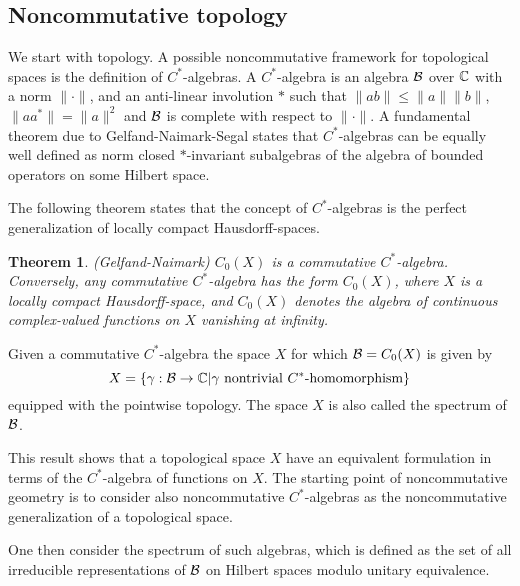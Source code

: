 \documentclass[12pt]{article}
\newcommand{\nn}{\nonumber}
\def\cb{{\cal B}}
\newtheorem{thm}{Theorem}[subsection]
\newcommand{\bbC}{{\Bbb C}}
\begin{document}



\subsection{Noncommutative topology}

We start with topology. A possible noncommutative framework for topological spaces is the definition of  $C^*$-algebras. 
%
A $C^*$-algebra is an algebra $\cb$ over $\bbC$ with a norm $\| \cdot \|$, and an anti-linear involution $*$ such that $\|ab\|\leq \| a\|\| b\|$, $\|aa^* \|=\| a\|^2$ and $\cb$ is complete with respect to $\| \cdot \|$. 
%
A fundamental theorem due to Gelfand-Naimark-Segal states that $C^*$-algebras can be equally well defined  as norm closed $*$-invariant subalgebras of the algebra of bounded operators on some Hilbert space.    
%

The following theorem states that the concept of $C^*$-algebras is the perfect generalization of  locally compact Hausdorff-spaces.   
%
\begin{thm} \label{gn}
(\textit{Gelfand-Naimark})
%
$C_0(X)$ is a commutative $C^*$-algebra. 
%
Conversely, any commutative $C^*$-algebra has the form $C_0(X) $, where $X$ is a locally compact Hausdorff-space, and $C_0(X)$ denotes the algebra of continuous complex-valued functions on $X$ vanishing at infinity.



  
\end{thm} 

Given a commutative $C^*$-algebra the space $X$ for which $\cb=C_0(X)$ is given by
\begin{equation}X= \{ \gamma :\cb \to \bbC | \gamma \hbox{ nontrivial }C^*\hbox{-homomorphism} \}\nn  \end{equation}
equipped with the pointwise topology. The space $X$ is also called the spectrum of $\cb$.
 
This result shows that a topological space $X$ have an equivalent formulation in terms of the $C^*$-algebra of functions on $X$. The starting point of noncommutative geometry is to consider also noncommutative $C^*$-algebras as the noncommutative generalization of a topological space. 


One then consider the spectrum of such algebras, which is defined as the set of all irreducible representations of $\cb$ on Hilbert spaces modulo unitary equivalence.
\end{document}
